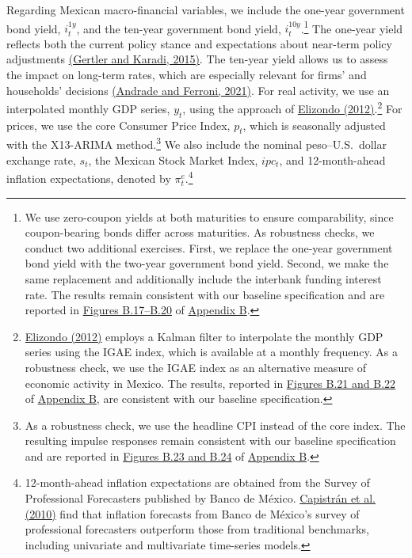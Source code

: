 \documentclass[\latexroot/\projectname]{subfiles}
\begin{document}
Regarding Mexican macro-financial variables, we include the one-year government bond yield, $i_t^{1y}$, and the ten-year government bond yield, $i_t^{10y}$.\footnote{We use zero-coupon yields at both maturities to ensure comparability, since coupon-bearing bonds differ across maturities. As robustness checks, we conduct two additional exercises. First, we replace the one-year government bond yield with the two-year government bond yield. Second, we make the same replacement and additionally include the interbank funding interest rate. The results remain consistent with our baseline specification and are reported in \hyperlink{Figure B.17}{Figures B.17--B.20} of \hyperlink{Appendix B}{Appendix B}.} The one-year yield reflects both the current policy stance and expectations about near-term policy adjustments \hyperlink{Gertler and Karadi (2015)}{(Gertler and Karadi, 2015)}. The ten-year yield allows us to assess the impact on long-term rates, which are especially relevant for firms' and households' decisions \hyperlink{Andrade and Ferroni (2021)}{(Andrade and Ferroni, 2021)}. For real activity, we use an interpolated monthly GDP series, $y_t$, using the approach of \hyperlink{Elizondo (2012)}{Elizondo (2012)}.\footnote{\hyperlink{Elizondo (2012)}{Elizondo (2012)} employs a Kalman filter to interpolate the monthly GDP series using the IGAE index, which is available at a monthly frequency. As a robustness check, we use the IGAE index as an alternative measure of economic activity in Mexico. The results, reported in \hyperlink{Figure B.21}{Figures B.21 and B.22} of \hyperlink{Appendix B}{Appendix B}, are consistent with our baseline specification.} For prices, we use the core Consumer Price Index, $p_t$, which is seasonally adjusted with the X13-ARIMA method.\footnote{As a robustness check, we use the headline CPI instead of the core index. The resulting impulse responses remain consistent with our baseline specification and are reported in \hyperlink{Figure B.15}{Figures B.23 and B.24} of \hyperlink{Appendix B}{Appendix B}.} We also include the nominal peso--U.S.\ dollar exchange rate, $s_t$, the Mexican Stock Market Index, $ipc_t$, and 12-month-ahead inflation expectations, denoted by $\pi^{e}_{t}$.\footnote{12-month-ahead inflation expectations are obtained from the Survey of Professional Forecasters published by Banco de México. \hyperlink{Capistran et al. (2010)}{Capistrán et al. (2010)} find that inflation forecasts from Banco de México's survey of professional forecasters outperform those from traditional benchmarks, including univariate and multivariate time-series models.}
\end{document}
